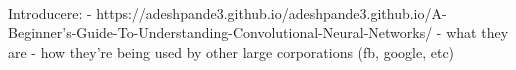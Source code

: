\paragraph{}
Introducere:
    - https://adeshpande3.github.io/adeshpande3.github.io/A-Beginner's-Guide-To-Understanding-Convolutional-Neural-Networks/
    - what they are
    - how they're being used by other large corporations (fb, google, etc)